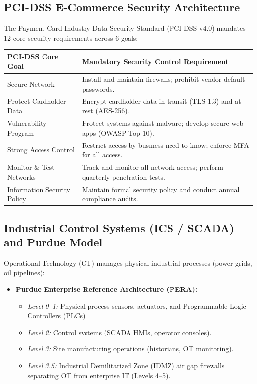 \documentclass[12pt,a4paper]{article}
\renewcommand{\arraystretch}{1.45}
\begin{document}
\subsection{PCI-DSS E-Commerce Security Architecture}
The Payment Card Industry Data Security Standard (PCI-DSS v4.0) mandates 12 core security requirements across 6 goals:

{\renewcommand{\arraystretch}{1.45}%
\begin{tabularx}{\linewidth}{|B{4.5cm}|Y|}
\hline
\textbf{PCI-DSS Core Goal} & \textbf{Mandatory Security Control Requirement} \\
\hline
Secure Network & Install and maintain firewalls; prohibit vendor default passwords. \\
\hline
Protect Cardholder Data & Encrypt cardholder data in transit (TLS 1.3) and at rest (AES-256). \\
\hline
Vulnerability Program & Protect systems against malware; develop secure web apps (OWASP Top 10). \\
\hline
Strong Access Control & Restrict access by business need-to-know; enforce MFA for all access. \\
\hline
Monitor \& Test Networks & Track and monitor all network access; perform quarterly penetration tests. \\
\hline
Information Security Policy & Maintain formal security policy and conduct annual compliance audits. \\
\hline
\end{tabularx}}

\subsection{Industrial Control Systems (ICS / SCADA) and Purdue Model}
Operational Technology (OT) manages physical industrial processes (power grids, oil pipelines):
\begin{itemize}[leftmargin=*, itemsep=3pt]
  \item \textbf{Purdue Enterprise Reference Architecture (PERA):}
    \begin{itemize}
      \item \textit{Level 0--1:} Physical process sensors, actuators, and Programmable Logic Controllers (PLCs).
      \item \textit{Level 2:} Control systems (SCADA HMIs, operator consoles).
      \item \textit{Level 3:} Site manufacturing operations (historians, OT monitoring).
      \item \textit{Level 3.5:} Industrial Demilitarized Zone (IDMZ) air gap firewalls separating OT from enterprise IT (Levels 4--5).
    \end{itemize}
\end{itemize}
\end{document}
